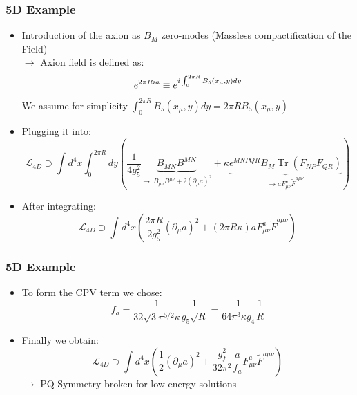 \documentclass[aspectratio=1610, 9pt]{beamer}
\DeclareMathOperator{\Tr}{Tr}
\begin{document}
\begin{frame}
	\frametitle{5D Example}
		\begin{itemize}
			\item Introduction of the axion as $B_M$ zero-modes (Massless compactification of the Field)\\
			$\rightarrow$ Axion field is defined as: 
			\begin{equation*}
				{\Large e^{2\pi R i a} \equiv e^{i\int_{0}^{2\pi R}B_5(x_\mu, y)dy}}
			\end{equation*}
			We assume for simplicity $\int_{0}^{2\pi R}B_5(x_\mu, y)dy = 2\pi RB_5(x_\mu, y)$
			\item Plugging it into:
			\begin{equation*}
				\mathcal{L}_{4D} \supset \int d^4x \int_0^{2\pi R} dy \left( \frac{1}{4 g_5^2} \underbrace{B_{MN} B^{MN}}_{\rightarrow\ B_{\mu\nu}B^{\mu\nu} + 2(\partial_\mu a)^2} + \kappa \underbrace{\epsilon^{MNPQR} B_M \Tr(F_{NP} F_{QR})}_{\rightarrow aF_{\mu\nu}^a \tilde{F}^{a\mu\nu}} \right)
			\end{equation*}
			\item After integrating:
			\begin{equation*}
				\mathcal{L}_{4D} \supset \int d^4x \left( \frac{2\pi R}{2g_5^2} (\partial_\mu a)^2 + (2\pi R \kappa) a F_{\mu\nu}^a \tilde{F}^{a\mu\nu} \right)
			\end{equation*}
		\end{itemize}
\end{frame}

\begin{frame}
	\frametitle{5D Example}
	\begin{itemize}
		\item To form the CPV term we chose:
		\begin{equation*}
			f_a = \frac{1}{32 \sqrt{3} \pi^{5/2} \kappa} \frac{1}{g_5 \sqrt{R}} = \frac{1}{64 \pi^3 \kappa g_4} \frac{1}{R}
		\end{equation*}
		\item Finally we obtain:
		\begin{equation*}
			\mathcal{L}_{4D} \supset \int d^4x \left( \frac{1}{2} (\partial_\mu a)^2 + \frac{g_f^2}{32 \pi^2} \frac{a}{f_a} F_{\mu\nu}^a \tilde{F}^{a\mu\nu} \right)
		\end{equation*}
		$\rightarrow$ PQ-Symmetry broken for low energy solutions\\
		
	\end{itemize}
\end{frame}
\end{document}
